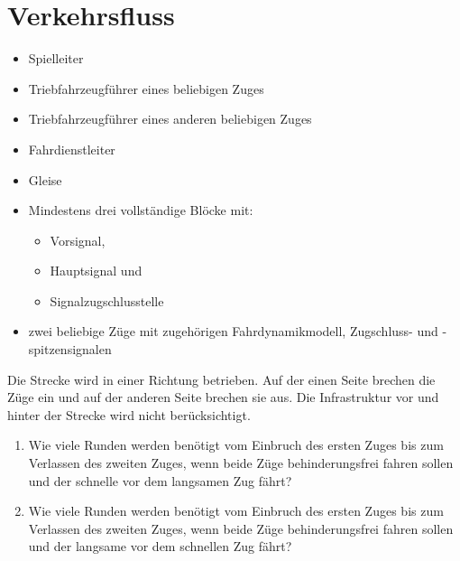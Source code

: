 

\section{Verkehrsfluss}

  \roles
    \begin{itemize}
      \item Spielleiter
      \item Triebfahrzeugführer eines beliebigen Zuges
      \item Triebfahrzeugführer eines anderen beliebigen Zuges
      \item Fahrdienstleiter
    \end{itemize}

  \material
    \begin{itemize}
      \item Gleise
      \item Mindestens drei vollständige Blöcke mit:
      \begin{itemize}
        \item Vorsignal,
        \item Hauptsignal und
        \item Signalzugschlusstelle
      \end{itemize}
      \item zwei beliebige Züge mit zugehörigen Fahrdynamikmodell, Zugschluss- und -spitzensignalen
    \end{itemize}

  \setup
    Die Strecke wird in einer Richtung betrieben. Auf der einen Seite brechen die Züge ein und auf der anderen Seite brechen sie aus. Die Infrastruktur vor und hinter der Strecke wird nicht berücksichtigt.

  \task
    \begin{enumerate}[label=\alph*)]
      \item Wie viele Runden werden benötigt vom Einbruch des ersten Zuges bis zum Verlassen des zweiten Zuges, wenn beide Züge behinderungsfrei fahren sollen und der schnelle vor dem langsamen Zug fährt?
      \item Wie viele Runden werden benötigt vom Einbruch des ersten Zuges bis zum Verlassen des zweiten Zuges, wenn beide Züge behinderungsfrei fahren sollen und der langsame vor dem schnellen Zug fährt?
    \end{enumerate}
